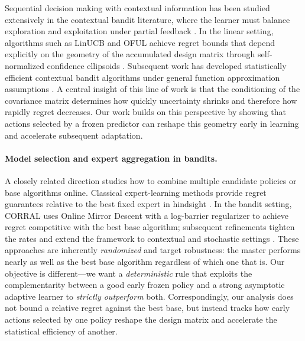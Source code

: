 \documentclass{article}
\theoremstyle{definition}
\theoremstyle{remark}
\theoremstyle{remark}
\begin{document}
Sequential decision making with contextual information has been studied
extensively in the contextual bandit literature, where the learner must
balance exploration and exploitation under partial feedback
\cite{langford2007epoch,agarwal2014taming,foster2021statistical,
lattimore2020bandit}. In the linear setting, algorithms such as LinUCB and
OFUL achieve regret bounds that depend explicitly on the geometry of the
accumulated design matrix through self-normalized confidence ellipsoids
\cite{chu2011contextual,abbasi2011improved}. Subsequent work has developed
statistically efficient contextual bandit algorithms under general function
approximation assumptions \cite{agarwal2012contextual,foster2018practical,
foster2020beyond,simchi2022bypassing,zhu2022contextual,rucker2023infinite,
zhang2024efficient}. A central insight of this line of work is that the
conditioning of the covariance matrix determines how quickly uncertainty
shrinks and therefore how rapidly regret decreases. Our work builds on this
perspective by showing that actions selected by a frozen predictor can
reshape this geometry early in learning and accelerate subsequent adaptation.

\paragraph{Model selection and expert aggregation in bandits.}
A closely related direction studies how to combine multiple candidate
policies or base algorithms online. Classical expert-learning methods provide
regret guarantees relative to the best fixed expert in hindsight
\cite{auer2002nonstochastic}. In the bandit setting, CORRAL
\cite{agarwal2017corralling} uses Online Mirror Descent with a log-barrier
regularizer to achieve regret competitive with the best base algorithm;
subsequent refinements tighten the rates and extend the framework to
contextual and stochastic settings
\cite{pacchiano2020model,marinov2021pareto,zhu2022pareto,zhu2022near,
dann2024data}. These approaches are inherently \emph{randomized} and target
robustness: the master performs nearly as well as the best base algorithm
regardless of which one that is. Our objective is different---we want a
\emph{deterministic} rule that exploits the complementarity between a good
early frozen policy and a strong asymptotic adaptive learner to
\emph{strictly outperform} both. Correspondingly, our analysis does not
bound a relative regret against the best base, but instead tracks how early
actions selected by one policy reshape the design matrix and accelerate the
statistical efficiency of another.
\end{document}

